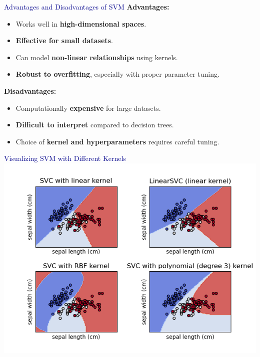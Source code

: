 \begin{frame}{\textcolor{darkblue}{Advantages and Disadvantages of SVM}}
    \textbf{Advantages:}
    \begin{itemize}
        \item Works well in \textbf{high-dimensional spaces}.
        \item \textbf{Effective for small datasets}.
        \item Can model \textbf{non-linear relationships} using kernels.
        \item \textbf{Robust to overfitting}, especially with proper parameter tuning.
    \end{itemize}

    \vspace{0.4cm}
    \textbf{Disadvantages:}
    \begin{itemize}
        \item Computationally \textbf{expensive} for large datasets.
        \item \textbf{Difficult to interpret} compared to decision trees.
        \item Choice of \textbf{kernel and hyperparameters} requires careful tuning.
    \end{itemize}
\end{frame}

\begin{frame}{\textcolor{darkblue}{Visualizing SVM with Different Kernels}}
\centering
    \includegraphics[width=0.65\linewidth]{Sections/TP3/Images/SVM_kernel.png}
\end{frame}


